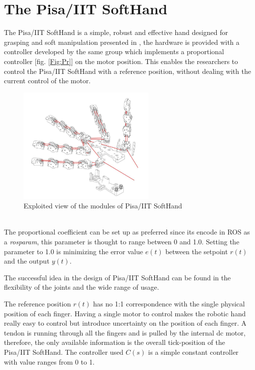 \section{The Pisa/IIT SoftHand}
The Pisa/IIT SoftHand is a simple, robust and effective hand designed for grasping and soft manipulation presented in \cite{catalanopisa}, the hardware is provided with a controller developed by the same group which implements a proportional controller [fig. \ref{Fig:Pr}] on the motor position. This enables the researchers to control the Pisa/IIT SoftHand with a reference position, without dealing with the current control of the motor.\\
\begin{figure}[h]
\centering
\includegraphics[width=0.6\textwidth]{Figure/softhand.png}
\caption{Exploited view of the modules of Pisa/IIT SoftHand}
\label{Fig:Softhand}
\end{figure}\\
The proportional coefficient can be set up as preferred since its encode in ROS as a \textit{rosparam}, this parameter is thought to range between 0 and 1.0. Setting the parameter to 1.0 is minimizing the error value $e(t)$  between the setpoint $r(t)$ and the output $y(t)$.

The successful idea in the design of Pisa/IIT SoftHand can be found in the flexibility of the joints and the wide range of usage.

The reference position $r(t)$ has no 1:1 correspondence with the single physical position of each finger. Having a single motor to control makes the robotic hand really easy to control but introduce uncertainty on the position of each finger. A tendon is running through all the fingers and is pulled by the internal dc motor, therefore, the only available information is the overall tick-position of the Pisa/IIT SoftHand. The controller used $C(s)$ is a simple constant controller with value ranges from 0 to 1. 


